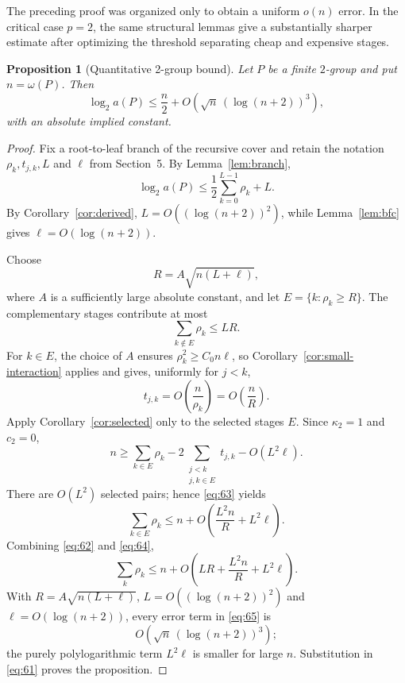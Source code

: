 \documentclass[11pt]{article}
\newtheorem{proposition}[theorem]{Proposition}
\theoremstyle{definition}
\theoremstyle{remark}
\begin{document}
The preceding proof was organized only to obtain a uniform $o(n)$ error. In the critical case $p=2$, the same structural lemmas give a substantially sharper estimate after optimizing the threshold separating cheap and expensive stages.

\begin{proposition}[Quantitative 2-group bound]\label{prop:2group}
Let $P$ be a finite $2$-group and put $n=\omega(P)$. Then
\[
\log_2a(P)\le\frac n2+O\!\left(\sqrt n\,(\log(n+2))^3\right),
\]
with an absolute implied constant.
\end{proposition}

\begin{proof}
Fix a root-to-leaf branch of the recursive cover and retain the notation $\rho_k,t_{j,k},L$ and $\ell$ from Section~5. By Lemma~\ref{lem:branch},
\begin{equation}\label{eq:61}
\log_2a(P)\le\frac12\sum_{k=0}^{L-1}\rho_k+L.
\end{equation}
By Corollary~\ref{cor:derived}, $L=O((\log(n+2))^2)$, while Lemma~\ref{lem:bfc} gives $\ell=O(\log(n+2))$.

Choose
\[
R=A\sqrt{n(L+\ell)},
\]
where $A$ is a sufficiently large absolute constant, and let $E=\{k:\rho_k\ge R\}$. The complementary stages contribute at most
\begin{equation}\label{eq:62}
\sum_{k\notin E}\rho_k\le LR.
\end{equation}
For $k\in E$, the choice of $A$ ensures $\rho_k^2\ge C_0n\ell$, so Corollary~\ref{cor:small-interaction} applies and gives, uniformly for $j<k$,
\begin{equation}\label{eq:63}
t_{j,k}=O\!\left(\frac n{\rho_k}\right)=O\!\left(\frac nR\right).
\end{equation}
Apply Corollary~\ref{cor:selected} only to the selected stages $E$. Since $\kappa_2=1$ and $c_2=0$,
\[
n\ge\sum_{k\in E}\rho_k-2\!\sum_{\substack{j<k\\j,k\in E}}t_{j,k}-O(L^2\ell).
\]
There are $O(L^2)$ selected pairs; hence \eqref{eq:63} yields
\begin{equation}\label{eq:64}
\sum_{k\in E}\rho_k\le n+O\!\left(\frac{L^2n}{R}+L^2\ell\right).
\end{equation}
Combining \eqref{eq:62} and \eqref{eq:64},
\begin{equation}\label{eq:65}
\sum_k\rho_k\le n+O\!\left(LR+\frac{L^2n}{R}+L^2\ell\right).
\end{equation}
With $R=A\sqrt{n(L+\ell)}$, $L=O((\log(n+2))^2)$ and $\ell=O(\log(n+2))$, every error term in \eqref{eq:65} is
\[
O\!\left(\sqrt n\,(\log(n+2))^3\right);
\]
the purely polylogarithmic term $L^2\ell$ is smaller for large $n$. Substitution in \eqref{eq:61} proves the proposition.
\end{proof}
\end{document}
